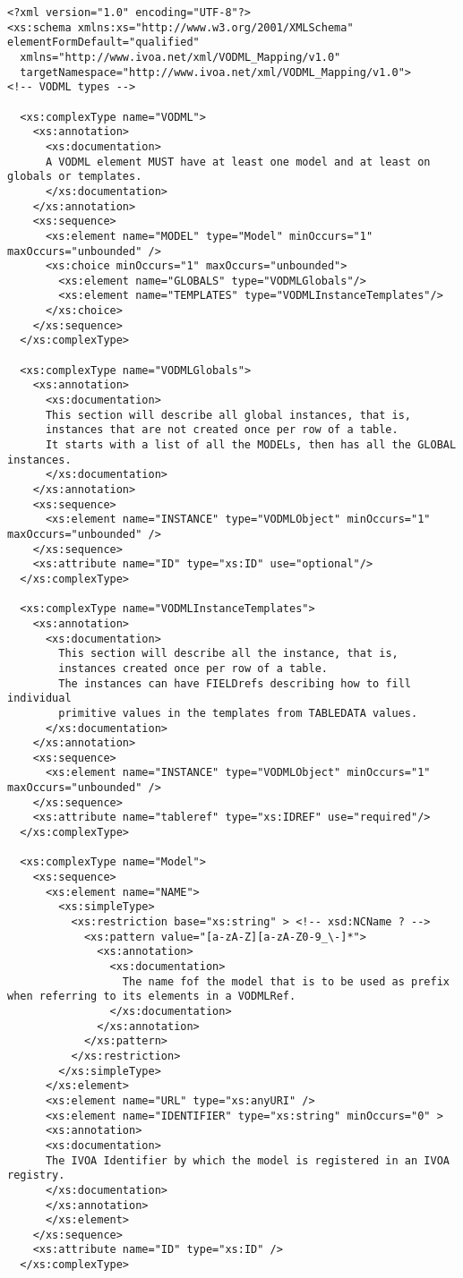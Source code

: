 \documentclass[11pt,a4paper]{ivoa}
\begin{document}
\begin{lstlisting}[label=lst:mapping,caption=VOTable schema extension for VO-DML mapping,frame=tb]
<?xml version="1.0" encoding="UTF-8"?>
<xs:schema xmlns:xs="http://www.w3.org/2001/XMLSchema" elementFormDefault="qualified"
  xmlns="http://www.ivoa.net/xml/VODML_Mapping/v1.0" 
  targetNamespace="http://www.ivoa.net/xml/VODML_Mapping/v1.0">
<!-- VODML types -->
  
  <xs:complexType name="VODML">
    <xs:annotation>
      <xs:documentation>
      A VODML element MUST have at least one model and at least on globals or templates.
      </xs:documentation>
    </xs:annotation>
    <xs:sequence>
      <xs:element name="MODEL" type="Model" minOccurs="1" maxOccurs="unbounded" />
      <xs:choice minOccurs="1" maxOccurs="unbounded">
        <xs:element name="GLOBALS" type="VODMLGlobals"/>
        <xs:element name="TEMPLATES" type="VODMLInstanceTemplates"/> 
      </xs:choice>
    </xs:sequence>
  </xs:complexType>
  
  <xs:complexType name="VODMLGlobals">
    <xs:annotation>
      <xs:documentation>
      This section will describe all global instances, that is, 
      instances that are not created once per row of a table.
      It starts with a list of all the MODELs, then has all the GLOBAL instances.
      </xs:documentation>
    </xs:annotation>
    <xs:sequence>
      <xs:element name="INSTANCE" type="VODMLObject" minOccurs="1" maxOccurs="unbounded" />
    </xs:sequence>
    <xs:attribute name="ID" type="xs:ID" use="optional"/>
  </xs:complexType>

  <xs:complexType name="VODMLInstanceTemplates">
    <xs:annotation>
      <xs:documentation>
        This section will describe all the instance, that is, 
        instances created once per row of a table.
        The instances can have FIELDrefs describing how to fill individual 
        primitive values in the templates from TABLEDATA values.
      </xs:documentation>
    </xs:annotation>
    <xs:sequence>
      <xs:element name="INSTANCE" type="VODMLObject" minOccurs="1" maxOccurs="unbounded" />
    </xs:sequence>
    <xs:attribute name="tableref" type="xs:IDREF" use="required"/>
  </xs:complexType>

  <xs:complexType name="Model">
    <xs:sequence>
      <xs:element name="NAME">
        <xs:simpleType>
          <xs:restriction base="xs:string" > <!-- xsd:NCName ? -->
            <xs:pattern value="[a-zA-Z][a-zA-Z0-9_\-]*">
              <xs:annotation>
                <xs:documentation>
                  The name fof the model that is to be used as prefix when referring to its elements in a VODMLRef.
                </xs:documentation>
              </xs:annotation>
            </xs:pattern>
          </xs:restriction>      
        </xs:simpleType>
      </xs:element>
      <xs:element name="URL" type="xs:anyURI" />
      <xs:element name="IDENTIFIER" type="xs:string" minOccurs="0" >
      <xs:annotation>
      <xs:documentation>
      The IVOA Identifier by which the model is registered in an IVOA registry.
      </xs:documentation>
      </xs:annotation>
      </xs:element>
    </xs:sequence>
    <xs:attribute name="ID" type="xs:ID" />
  </xs:complexType>


\end{lstlisting}
\end{document}
